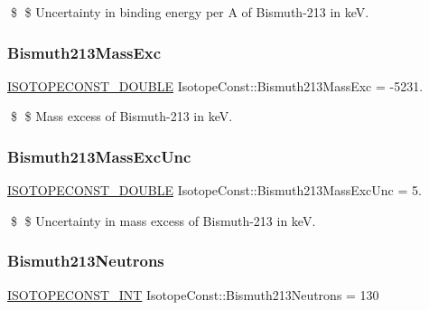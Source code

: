 \$ \$ Uncertainty in binding energy per A of Bismuth-\/213 in keV. \mbox{\label{group___isotope_const-_bismuth-_bi213_ga019a361547772bbf6a2becc583814485}} 
\subsubsection{\texorpdfstring{Bismuth213\+Mass\+Exc}{Bismuth213MassExc}}
{\footnotesize\ttfamily \mbox{\hyperlink{group___isotope_const-_macros_ga8f45a7272ce02c0b4c65c44636ed719a}{I\+S\+O\+T\+O\+P\+E\+C\+O\+N\+S\+T\+\_\+\+D\+O\+U\+B\+LE}} Isotope\+Const\+::\+Bismuth213\+Mass\+Exc = -\/5231.}

\$ \$ Mass excess of Bismuth-\/213 in keV. \mbox{\label{group___isotope_const-_bismuth-_bi213_ga59e039270ab3b0288209f7bac76bcd7b}} 
\subsubsection{\texorpdfstring{Bismuth213\+Mass\+Exc\+Unc}{Bismuth213MassExcUnc}}
{\footnotesize\ttfamily \mbox{\hyperlink{group___isotope_const-_macros_ga8f45a7272ce02c0b4c65c44636ed719a}{I\+S\+O\+T\+O\+P\+E\+C\+O\+N\+S\+T\+\_\+\+D\+O\+U\+B\+LE}} Isotope\+Const\+::\+Bismuth213\+Mass\+Exc\+Unc = 5.}

\$ \$ Uncertainty in mass excess of Bismuth-\/213 in keV. \mbox{\label{group___isotope_const-_bismuth-_bi213_gacb541ffbac2f6c4bf667e3a50c8c904d}} 
\subsubsection{\texorpdfstring{Bismuth213\+Neutrons}{Bismuth213Neutrons}}
{\footnotesize\ttfamily \mbox{\hyperlink{group___isotope_const-_macros_ga5f18360b3e99483a35c32d789e62621c}{I\+S\+O\+T\+O\+P\+E\+C\+O\+N\+S\+T\+\_\+\+I\+NT}} Isotope\+Const\+::\+Bismuth213\+Neutrons = 130}

